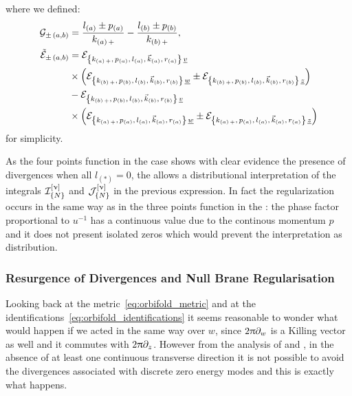 where we defined:
\begin{equation}
  \begin{split}
    \mathcal{G}_{\pm\,\left( a, b \right)}
    & =
    \frac{l_{(a)} \pm p_{(a)}}{k_{\qty(a)\, +}}
    -
    \frac{l_{(b)} \pm p_{(b)}}{k_{\qty(b)\, +}},
    \\
    \tilde{\mathcal{E}}_{\pm\,\left( a, b \right)}
    & =
    \mathcal{E}_{\qty{k_{\qty(a)\, +},\, p_{\qty(a)},\, l_{\qty(a)},\, \vec{k}_{\qty(a)},\, r_{\qty(a)}}\, \underline{v}}
    \\
    & \times
    \qty( \mathcal{E}_{\qty{k_{\qty(b)\, +},\, p_{\qty(b)},\, l_{\qty(b)},\, \vec{k}_{\qty(b)},\, r_{\qty(b)}}\, \underline{w}} \pm \mathcal{E}_{\qty{k_{\qty(b)\, +},\, p_{\qty(b)},\, l_{\qty(b)},\, \vec{k}_{\qty(b)},\, r_{\qty(b)}}\, \underline{z}} )
    \\
    & -
    \mathcal{E}_{\qty{k_{\qty(b)\, +},\, p_{\qty(b)},\, l_{\qty(b)},\, \vec{k}_{\qty(b)},\, r_{\qty(b)}}\, \underline{v}}
    \\
    & \times
    \qty( \mathcal{E}_{\qty{k_{\qty(a)\, +},\, p_{\qty(a)},\, l_{\qty(a)},\, \vec{k}_{\qty(a)},\, r_{\qty(a)}}\, \underline{w}} \pm \mathcal{E}_{\qty{k_{\qty(a)\, +},\, p_{\qty(a)},\, l_{\qty(a)},\, \vec{k}_{\qty(a)},\, r_{\qty(a)}}\, \underline{z}} )
  \end{split}
\end{equation}
for simplicity.

As the four points function in the \nbo case shows with clear evidence the presence of divergences when all $l_{(*)} = 0$, the \gnbo allows a distributional interpretation of the integrals $\mathcal{I}_{\qty{N}}^{\qty[\upnu]}$ and $\mathcal{J}_{\qty{N}}^{\qty[\upnu]}$ in the previous expression.
In fact the regularization occurs in the same way as in the three points function in the \gnbo: the phase factor proportional to $u^{-1}$ has a continuous value due to the continous momentum $p$ and it does not present isolated zeros which would prevent the interpretation as distribution.


\subsubsection{Resurgence of Divergences and Null Brane Regularisation}

Looking back at the metric~\eqref{eq:orbifold_metric} and at the identifications~\eqref{eq:orbifold_identifications} it seems reasonable to wonder what would happen if we acted in the same way over $w$, since $2 \uppi \partial_{w}$ is a Killing vector as well and it commutes with $2 \uppi \partial_{z}$.
However from the analysis of \nbo and \gnbo, in the absence of at least one continuous transverse direction it is not possible to avoid the divergences associated with discrete zero energy modes and this is exactly what happens.

